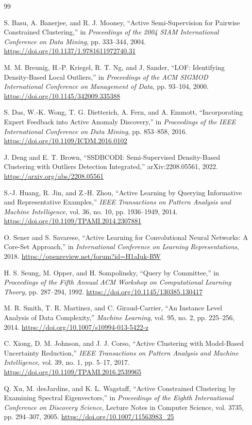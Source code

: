 \documentclass[11pt]{article}
\begin{document}
\begin{thebibliography}{99}

S. Basu, A. Banerjee, and R. J. Mooney,
``Active Semi-Supervision for Pairwise Constrained Clustering,''
in \emph{Proceedings of the 2004 SIAM International Conference on Data Mining},
pp. 333--344, 2004.
\url{https://doi.org/10.1137/1.9781611972740.31}

M. M. Breunig, H.-P. Kriegel, R. T. Ng, and J. Sander,
``LOF: Identifying Density-Based Local Outliers,''
in \emph{Proceedings of the ACM SIGMOD International Conference on Management
of Data}, pp. 93--104, 2000.
\url{https://doi.org/10.1145/342009.335388}

S. Das, W.-K. Wong, T. G. Dietterich, A. Fern, and A. Emmott,
``Incorporating Expert Feedback into Active Anomaly Discovery,''
in \emph{Proceedings of the IEEE International Conference on Data Mining},
pp. 853--858, 2016.
\url{https://doi.org/10.1109/ICDM.2016.0102}

J. Deng and E. T. Brown,
``SSDBCODI: Semi-Supervised Density-Based Clustering with Outliers Detection
Integrated,''
arXiv:2208.05561, 2022.
\url{https://arxiv.org/abs/2208.05561}

S.-J. Huang, R. Jin, and Z.-H. Zhou,
``Active Learning by Querying Informative and Representative Examples,''
\emph{IEEE Transactions on Pattern Analysis and Machine Intelligence},
vol. 36, no. 10, pp. 1936--1949, 2014.
\url{https://doi.org/10.1109/TPAMI.2014.2307881}

O. Sener and S. Savarese,
``Active Learning for Convolutional Neural Networks: A Core-Set Approach,''
in \emph{International Conference on Learning Representations}, 2018.
\url{https://openreview.net/forum?id=H1aIuk-RW}

H. S. Seung, M. Opper, and H. Sompolinsky,
``Query by Committee,''
in \emph{Proceedings of the Fifth Annual ACM Workshop on Computational Learning
Theory}, pp. 287--294, 1992.
\url{https://doi.org/10.1145/130385.130417}

M. R. Smith, T. R. Martinez, and C. Giraud-Carrier,
``An Instance Level Analysis of Data Complexity,''
\emph{Machine Learning}, vol. 95, no. 2, pp. 225--256, 2014.
\url{https://doi.org/10.1007/s10994-013-5422-z}

C. Xiong, D. M. Johnson, and J. J. Corso,
``Active Clustering with Model-Based Uncertainty Reduction,''
\emph{IEEE Transactions on Pattern Analysis and Machine Intelligence},
vol. 39, no. 1, pp. 5--17, 2017.
\url{https://doi.org/10.1109/TPAMI.2016.2539965}

Q. Xu, M. desJardins, and K. L. Wagstaff,
``Active Constrained Clustering by Examining Spectral Eigenvectors,''
in \emph{Proceedings of the Eighth International Conference on Discovery
Science}, Lecture Notes in Computer Science, vol. 3735, pp. 294--307, 2005.
\url{https://doi.org/10.1007/11563983_25}

\end{thebibliography}
\end{document}
